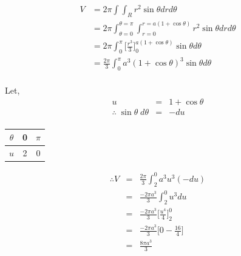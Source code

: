 \documentclass{article}
\begin{document}
\newpage
\subsection{}%
\large{

\begin{align*}
    V &= 2\pi \int \int_R r^2\sin\theta dr d\theta\\
    &=2\pi \int_{\theta = 0}^{\theta=\pi}\int_{r=0}^{r=a(1+\cos\theta)}r^2\sin\theta drd\theta\\
    &=2\pi \int_0^\pi\Bigg[\frac{r^3}{3}\Bigg]_0^{a(1+\cos\theta)}\sin\theta d\theta\\
    &=\frac{2\pi}{3}\int_0^\pi a^3(1+\cos\theta)^3\sin\theta d\theta\\
\end{align*}

Let,
\begin{eqnarray*}
    u &=& 1+\cos{\theta}\\
    \therefore\; \sin{\theta}\;d\theta &=& -du\\
\end{eqnarray*}

\begin{center}
    \begin{tabular}{ | c | c | c | }
        \hline
        $\theta$  & 0 & $\pi$\\
        \hline
        $u$     & 2 & 0 \\
        \hline
    \end{tabular}
\end{center}


\begin{eqnarray*}
    \therefore V &=& \frac{2\pi}{3}\int_2^0a^3u^3(-du)\\
                 &=& \frac{-2\pi a^3}{3}\int_2^0u^3du\\
                 &=& \frac{-2\pi a^3}{3}\Bigg[\frac{u^4}{4}\Bigg]_2^0\\
                 &=& \frac{-2\pi a^3}{3}\Bigg[0-\frac{16}{4}\Bigg]\\ 
                 &=& \frac{8\pi a^3}{3}\\
\end{eqnarray*}

}

\newpage
\end{document}
